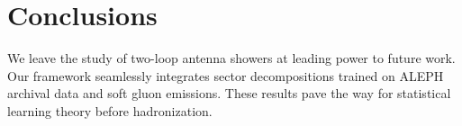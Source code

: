 \section{Conclusions}\label{sec:conclusions}

We leave the study of two-loop antenna showers at leading power to
future work. Our framework seamlessly integrates sector decompositions
trained on ALEPH archival data and soft gluon emissions. These results
pave the way for statistical learning theory before hadronization.

